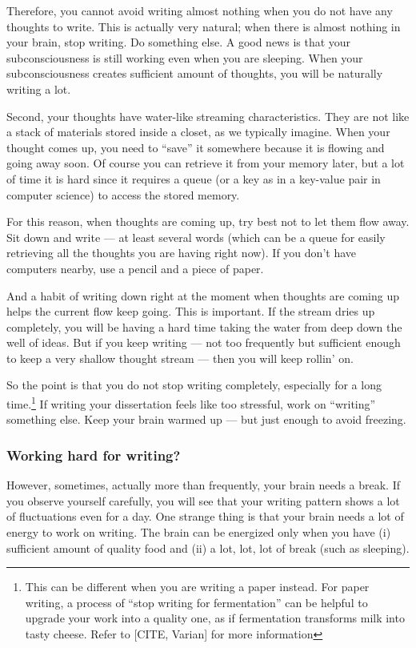 \documentclass[11pt]{article}
\begin{document}
Therefore, you cannot avoid writing almost nothing when you do not have any
thoughts to write. This is actually very natural; when there is almost nothing
in your brain, stop writing. Do something else. A good news is that your
subconsciousness is still working even when you are sleeping.  When your
subconsciousness creates sufficient amount of thoughts, you will be naturally
writing a lot. 

Second, your thoughts have water-like streaming characteristics.  They are not
like a stack of materials stored inside a closet, as we typically imagine.
When your thought comes up, you need to ``save'' it somewhere because it is
flowing and going away soon.  Of course you can retrieve it from your memory
later, but a lot of time it is hard since it requires a queue (or a key as in
a key-value pair in computer science) to access the stored memory.

For this reason, when thoughts are coming up, try best not to let them flow
away. Sit down and write --- at least several words (which can be a queue for
easily retrieving all the thoughts you are having right now). If you don't
have computers nearby, use a pencil and a piece of paper. 

And a habit of writing down right at the moment when thoughts are coming up
helps the current flow keep going. This is important. If the stream dries up
completely, you will be having a hard time taking the water from deep down the
well of ideas.  But if you keep writing --- not too frequently but sufficient
enough to keep a very shallow thought stream --- then you will keep rollin'
on.

So the point is that you do not stop writing completely, especially for a long
time.\footnote{This can be different when you are writing a paper instead. For
    paper writing, a process of ``stop writing for fermentation'' can be
    helpful to upgrade your work into a quality one, as if fermentation
transforms milk into tasty cheese. Refer to [CITE, Varian] for more
information} If writing your dissertation feels like too stressful, work on
``writing'' something else. Keep your brain warmed up --- but just enough to
avoid freezing. 

\subsubsection{Working hard for writing?}

However, sometimes, actually more than frequently, your brain needs a break.
If you observe yourself carefully, you will see that your writing pattern
shows a lot of fluctuations even for a day. One strange thing is that your
brain needs a lot of energy to work on writing. The brain can be energized
only when you have (i) sufficient amount of quality food and (ii) a lot, lot,
lot of break (such as sleeping). 
\end{document}
